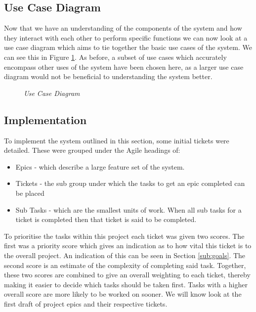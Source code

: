 \subsection{Use Case Diagram}

Now that we have an understanding of the components of the system and how they interact with each other to perform specific functions we can now look at a use case diagram which aims to tie together the basic use cases of the system. We can see this in Figure \ref{fig:use_case_diagram}. As before, a subset of use cases which accurately encompass other uses of the system have been chosen here, as a larger use case diagram would not be beneficial to understanding the system better. 

\begin{figure}[!ht]
\centering
{}
\caption{\em Use Case Diagram}
\label{fig:use_case_diagram}
\end{figure}

\newpage
\subsection{Implementation}
To implement the system outlined in this section, some initial tickets were detailed. These were grouped under the Agile headings of:

\begin{itemize}
	\item Epics - which describe a large feature set of the system.
	\item Tickets - the sub group under which the tasks to get an epic completed can be placed
	\item Sub Tasks - which are the smallest units of work. When all sub tasks for a ticket is completed then that ticket is said to be completed.
\end{itemize}

To prioritise the tasks within this project each ticket was given two scores. The first was a priority score which gives an indication as to how vital this ticket is to the overall project. An indication of this can be seen in Section \ref{sub:goals}. The second score is an estimate of the complexity of completing said task. Together, these two scores are combined to give an overall weighting to each ticket, thereby making it easier to decide which tasks should be taken first. Tasks with a higher overall score are more likely to be worked on sooner. We will know look at the first draft of project epics and their respective tickets.

